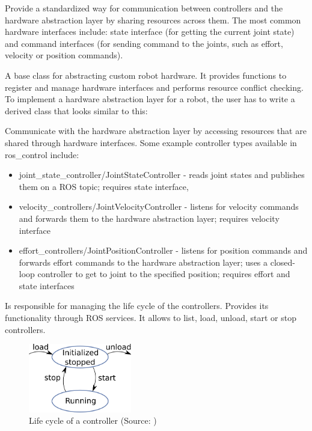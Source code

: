 \documentclass[english,inz,shortabstract]{iithesis}
\begin{document}
	\begin{description}[style=nextline]
		\item [Hardware interfaces]
		Provide a standardized way for communication between controllers and the hardware abstraction layer by sharing resources across them. The most common hardware interfaces include: state interface (for getting the current joint state) and command interfaces (for sending command to the joints, such as effort, velocity or position commands).   
		\item [RobotHW]
		A base class for abstracting custom robot hardware. It provides functions to register and manage hardware interfaces and performs resource conflict checking. To implement a hardware abstraction layer for a robot, the user has to write a derived class that looks similar to this:
		
		\item [Controllers]
		Communicate with the hardware abstraction layer by accessing resources that are shared through hardware interfaces. Some example controller types available in \textsf{ros\_control} include:
			\begin{itemize}
				\item \textsf{joint\_state\_controller/JointStateController} - reads joint states and publishes them on a ROS topic; requires state interface,
				\item \textsf{velocity\_controllers/JointVelocityController} - listens for velocity commands and forwards them to the hardware abstraction layer; requires velocity interface
				\item \textsf{effort\_controllers/JointPositionController} - listens for position commands and forwards effort commands to the hardware abstraction layer; uses a closed-loop controller to get to joint to the specified position; requires effort and state interfaces
			\end{itemize}
		\item [Controller Manager]
		Is responsible for managing the life cycle of the controllers. Provides its functionality through ROS services. It allows to list, load, unload, start or stop controllers. 
		\begin{figure}[ht]
			\centering
			\includegraphics[height=3cm]{img/controller_life.png}
			\caption{Life cycle of a controller (Source: \cite{ros_control:cm_wiki})}
			\label{fig:controller_life}
		\end{figure}

	\end{description}
\end{document}

